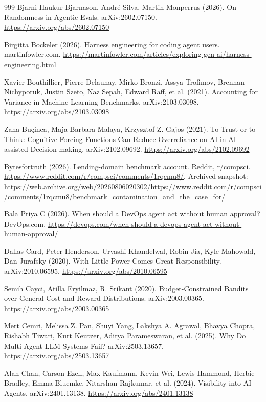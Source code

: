 \begin{thebibliography}{999}
 Bjarni Haukur Bjarnason, Andr\'{e} Silva, Martin Monperrus (2026). On Randomness in Agentic Evals. arXiv:2602.07150. \url{https://arxiv.org/abs/2602.07150}

 Birgitta Bockeler (2026). Harness engineering for coding agent users. martinfowler.com. \url{https://martinfowler.com/articles/exploring-gen-ai/harness-engineering.html}

 Xavier Bouthillier, Pierre Delaunay, Mirko Bronzi, Assya Trofimov, Brennan Nichyporuk, Justin Szeto, Naz Sepah, Edward Raff, et al. (2021). Accounting for Variance in Machine Learning Benchmarks. arXiv:2103.03098. \url{https://arxiv.org/abs/2103.03098}

 Zana Bu\c{c}inca, Maja Barbara Malaya, Krzysztof Z. Gajos (2021). To Trust or to Think: Cognitive Forcing Functions Can Reduce Overreliance on AI in AI-assisted Decision-making. arXiv:2102.09692. \url{https://arxiv.org/abs/2102.09692}

 Bytesfortruth (2026). Lending-domain benchmark account. Reddit, r/compsci. \url{https://www.reddit.com/r/compsci/comments/1rqcmu8/}. Archived snapshot: \url{https://web.archive.org/web/20260806020302/https://www.reddit.com/r/compsci/comments/1rqcmu8/benchmark_contamination_and_the_case_for/}

 Bala Priya C (2026). When should a DevOps agent act without human approval? DevOps.com. \url{https://devops.com/when-should-a-devops-agent-act-without-human-approval/}

 Dallas Card, Peter Henderson, Urvashi Khandelwal, Robin Jia, Kyle Mahowald, Dan Jurafsky (2020). With Little Power Comes Great Responsibility. arXiv:2010.06595. \url{https://arxiv.org/abs/2010.06595}

 Semih Cayci, Atilla Eryilmaz, R. Srikant (2020). Budget-Constrained Bandits over General Cost and Reward Distributions. arXiv:2003.00365. \url{https://arxiv.org/abs/2003.00365}

 Mert Cemri, Melissa Z. Pan, Shuyi Yang, Lakshya A. Agrawal, Bhavya Chopra, Rishabh Tiwari, Kurt Keutzer, Aditya Parameswaran, et al. (2025). Why Do Multi-Agent LLM Systems Fail? arXiv:2503.13657. \url{https://arxiv.org/abs/2503.13657}

 Alan Chan, Carson Ezell, Max Kaufmann, Kevin Wei, Lewis Hammond, Herbie Bradley, Emma Bluemke, Nitarshan Rajkumar, et al. (2024). Visibility into AI Agents. arXiv:2401.13138. \url{https://arxiv.org/abs/2401.13138}


\end{thebibliography}
